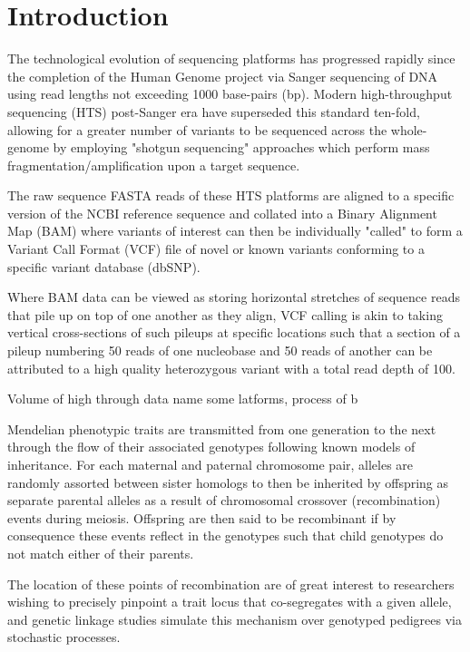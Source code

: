 
\section{Introduction}

The technological evolution of sequencing platforms has progressed rapidly since the completion of the Human Genome project via Sanger sequencing of DNA using read lengths not exceeding 1000 base-pairs (bp). Modern high-throughput  sequencing (HTS) post-Sanger era have superseded this standard ten-fold, allowing for a greater number of variants to be sequenced across the whole-genome by employing "shotgun sequencing" approaches which perform mass fragmentation/amplification upon a target sequence.

The raw sequence FASTA reads of these HTS platforms are aligned to a specific version of the NCBI reference sequence and collated into a Binary Alignment Map (BAM) where variants of interest can then be individually "called" to form a Variant Call Format (VCF) file of novel or known variants conforming to a specific variant database (dbSNP).

Where BAM data can be viewed as storing horizontal stretches of sequence reads that pile up on top of one another as they align, VCF calling is akin to taking vertical cross-sections of such pileups at specific locations such that a section of a pileup numbering 50 reads of one nucleobase and 50 reads of another can be attributed to a high quality heterozygous variant with a total read depth of 100.

Volume of high through data name some latforms, process of b

Mendelian phenotypic traits are transmitted from one generation to the next through the flow of their associated genotypes following known models of inheritance. For each maternal and paternal chromosome pair, alleles are randomly assorted between sister homologs to then be inherited by offspring as separate parental alleles as a result of chromosomal crossover (recombination) events during meiosis. Offspring are then said to be recombinant if by consequence these events reflect in the genotypes such that child genotypes do not match either of their parents.

\vspace{-1pt}
The location of these points of recombination are of great interest to researchers wishing to precisely pinpoint a trait locus that co-segregates with a given allele, and genetic linkage studies simulate this mechanism over genotyped pedigrees via stochastic processes. 

